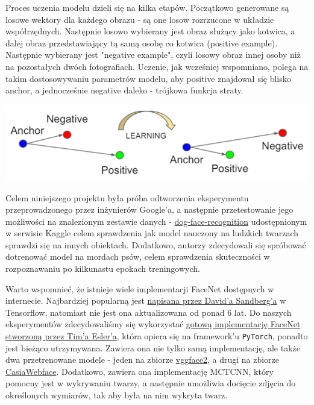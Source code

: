\documentclass[11pt]{article}
\begin{document}
    Proces uczenia modelu dzieli się na kilka etapów. Początkowo generowane są losowe wektory dla każdego obrazu - są one losow rozrzucone w układzie współrzędnych.
    Następnie losowo wybierany jest obraz służący jako kotwica, a dalej obraz przedstawiający tą samą osobę co kotwica (positive example). Następnie wybierany jest "negative example",
    czyli losowy obraz innej osoby niż na pozostałych dwóch fotografiach. Uczenie, jak wcześniej wspomniano, polega na takim dostosowywaniu parametrów modelu, aby positive znajdował się blisko anchor,
    a jednocześnie negative daleko - trójkowa funkcja straty.

    \begin{center}
        \includegraphics{triplet.png}
    \end{center}

    Celem niniejszego projektu była próba odtworzenia eksperymentu przeprowadzonego przez inżynierów Google'a, a następnie przetestowanie
    jego możliwości na znalezionym zestawie danych - \href{https://www.kaggle.com/datasets/wutheringwang/dog-face-recognition}{dog-face-recognition}
    udostępnionym w serwisie Kaggle celem sprawdzenia jak model nauczony na ludzkich twarzach sprawdzi się na innych obiektach.
    Dodatkowo, autorzy zdecydowali się spróbować dotrenować model na mordach psów, celem sprawdzenia skuteczności
    w rozpoznawaniu po kilkunastu epokach treningowych.

    Warto wspomnieć, że istnieje wiele implementacji FaceNet dostępnych w internecie. Najbardziej popularną jest \href{https://github.com/davidsandberg/facenet}{napisana przez David'a Sandberg'a}
    w Tensorflow, natomiast nie jest ona aktualizowana od ponad 6 lat. Do naszych eksperymentów zdecydowaliśmy się wykorzystać \href{https://github.com/timesler/facenet-pytorch}{gotową implementację FaceNet stworzoną przez Tim'a Esler'a},
    która opiera się na framework'u \texttt{PyTorch}, ponadto jest bieżąco utrzymywana.
    Zawiera ona nie tylko samą implementację, ale także dwa przetrenowane modele - jeden na zbiorze \href{https://paperswithcode.com/dataset/vggface2-1}{vggface2}, 
    a drugi na zbiorze \href{https://www.kaggle.com/datasets/debarghamitraroy/casia-webface}{CasiaWebface}. Dodatkowo, zawiera ona implementację MCTCNN, który pomocny jest w wykrywaniu
    twarzy, a następnie umożliwia docięcie zdjęcia do określonych wymiarów, tak aby była na nim wykryta twarz.
\end{document}
